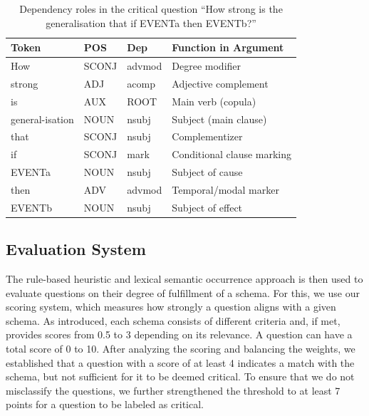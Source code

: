 \documentclass[11pt]{article}
\begin{document}
\begin{table}[H]
    \centering
    \begin{tabular}{p{1.2cm}llp{2.5cm}}
        \hline
        \textbf{Token} & \textbf{POS} & \textbf{Dep} & \textbf{Function in Argument} \\
        \hline
        How              & SCONJ   & advmod     & Degree modifier \\
        strong           & ADJ     & acomp      & Adjective complement \\
        is               & AUX     & ROOT       & Main verb (copula) \\
        general-isation   & NOUN    & nsubj      & Subject (main clause) \\
        that             & SCONJ   & nsubj      & Complementizer \\
        if               & SCONJ   & mark       & Conditional clause marking \\
        EVENTa           & NOUN    & nsubj      & Subject of cause \\
        then             & ADV     & advmod     & Temporal/modal marker \\
        EVENTb           & NOUN    & nsubj      & Subject of effect \\
        \hline
    \end{tabular}
    \caption{\label{tab:cause-effect-dependencies}
    Dependency roles in the critical question “How strong is the generalisation that if EVENTa then EVENTb?”
    }
\end{table}

\subsection{Evaluation System}
\label{evaluation system section}
The rule-based heuristic and lexical semantic occurrence approach is then used to evaluate questions on their degree of fulfillment of a schema. For this, we use our scoring system, which measures how strongly a question aligns with a given schema. As introduced, each schema consists of different criteria and, if met, provides scores from 0.5 to 3 depending on its relevance. A question can have a total score of 0 to 10. After analyzing the scoring and balancing the weights, we established that a question with a score of at least 4 indicates a match with the schema, but not sufficient for it to be deemed critical. To ensure that we do not misclassify the questions, we further strengthened the threshold to at least 7 points for a question to be labeled as critical.
\end{document}
